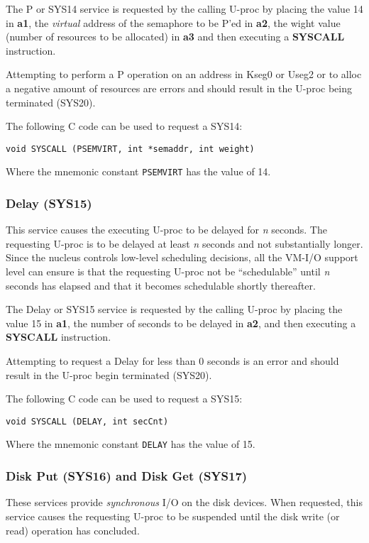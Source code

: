 The P or SYS14 service is requested by the calling U-proc by placing the value 14 in \textbf{a1}, the \emph{virtual} address of the semaphore to be P'ed in \textbf{a2}, the wight value (number of resources to be allocated) in \textbf{a3} and then executing a \textbf{SYSCALL} instruction.

Attempting to perform a P operation on an address in Kseg0 or Useg2 or to alloc a negative amount of resources are errors and should result in the U-proc being terminated (SYS20).

The following C code can be used to request a SYS14:
\begin{center}
\verb+void SYSCALL (PSEMVIRT, int *semaddr, int weight)+
\end{center}
Where the mnemonic constant \verb+PSEMVIRT+ has the value of 14.


\subsubsection{Delay (SYS15)}
This service causes the executing U-proc to be delayed for \emph{n} seconds. The requesting U-proc is to be delayed at least \emph{n} seconds and not substantially longer.
Since the nucleus controls low-level scheduling decisions, all the VM-I/O support level can ensure is that the requesting U-proc not be ``schedulable'' until \emph{n} seconds has elapsed and that it becomes schedulable shortly thereafter.

The Delay or SYS15 service is requested by the calling U-proc by placing the value 15 in \textbf{a1}, the number of seconds to be delayed in \textbf{a2}, and then executing a \textbf{SYSCALL} instruction.

Attempting to request a Delay for less than 0 seconds is an error and should result in the U-proc begin terminated (SYS20).

The following C code can be used to request a SYS15:
\begin{center}
\verb+void SYSCALL (DELAY, int secCnt)+
\end{center}
Where the mnemonic constant \verb+DELAY+ has the value of 15.


\subsubsection{Disk Put (SYS16) and Disk Get (SYS17)}
These services provide \emph{synchronous} I/O on the \uarm{} disk devices. 
When requested, this service causes the requesting U-proc to be suspended until the disk write (or read) operation has concluded.

